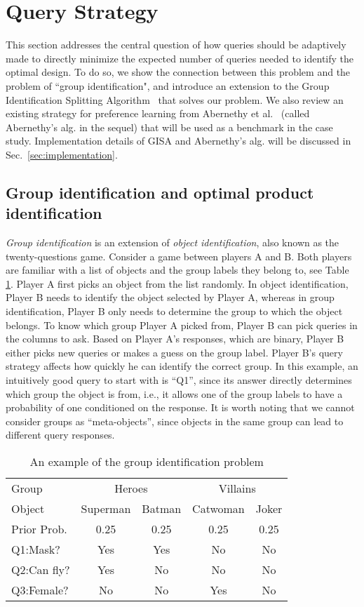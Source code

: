 \documentclass[onecolumn,11pt]{article}
\newcommand{\cutsectionup}{\vspace*{-0.1in}}
\newcommand{\cutsubsectionup}{\vspace*{-0.09in}}
\newcommand{\cutsectionup}{}
\newcommand{\cutsubsectionup}{}
\begin{document}
\cutsectionup
\section{Query Strategy}
\label{sec:act}
This section addresses the central question of how queries should be adaptively
made to directly minimize the expected number of queries needed to identify the optimal design. To do so, we show the connection between this problem and the problem of ``group identification", and introduce an extension to the Group Identification Splitting Algorithm~\cite{bellala2012group} that solves our problem. We also review an existing strategy for preference learning from Abernethy et al.~\cite{abernethy2008eliciting} (called Abernethy's alg. in the sequel) that will be used as a benchmark in the case study. Implementation details of GISA and Abernethy's alg. will be discussed in Sec.~\ref{sec:implementation}.

\cutsubsectionup
\subsection{Group identification and optimal product identification}
\label{subsec:group}
{\it Group identification} is an extension of {\it object identification}, also known
as the twenty-questions game. Consider a game between players A and B. Both
players are familiar with a list of objects and the group labels they belong to, see Table
\ref{tb:table2}. Player A first picks an object from the list randomly. In object identification, Player B needs to identify the object selected by Player A, whereas in group identification, Player B only needs to determine the group to which the object belongs. To know which group Player A picked from, Player B can pick queries in the columns to ask. Based on Player A's responses, which are binary, Player B either picks new queries or makes a guess on the group label. Player B's query strategy affects how quickly he can identify the correct group. In this example, an intuitively good query to start with is ``Q1'', since its answer directly determines which group the object is from, i.e., it allows one of the group labels to have a probability of one conditioned on the response. It is worth noting that we cannot consider groups as ``meta-objects'', since objects in the same group can lead to different query responses. 
\begin{table}
\centering
\caption{An example of the group identification problem} 
{\footnotesize
\begin{tabular}{l|cccc}
\hline
 Group & \multicolumn{2}{c}{Heroes} & \multicolumn{2}{c}{Villains} \\
 Object & Superman & Batman & Catwoman & Joker\\
 Prior Prob. & 0.25 & 0.25 & 0.25 & 0.25 \\
 \hline
 Q1:Mask? & Yes & Yes & No & No \\
 Q2:Can fly? & Yes & No & No & No \\
 Q3:Female? & No & No & Yes & No \\
\hline
\end{tabular}
}
\label{tb:table2}
\end{table}
\end{document}
